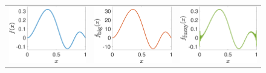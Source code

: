 \documentclass[graybox,footinfo]{svmult}
\begin{document}
\begin{figure}[ht]
\newcommand{\figwidth}{3.5cm}
	\centering
	\begin{tabular}{c@{\quad}c@{\quad}c}
		\includegraphics[width=\figwidth]{ProgramsImages/Function.eps} &
		\includegraphics[width=\figwidth]{ProgramsImages/Scaled.eps} &
		\includegraphics[width=\figwidth]{ProgramsImages/Filtered.eps}

\end{tabular}
\end{figure}
\end{document}
